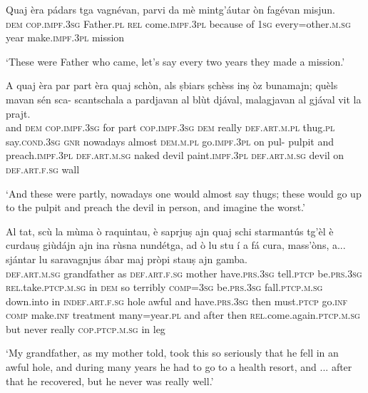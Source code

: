 \begin{linenumbers}
\gll   Quaj èra pádars tga vagnévan, parvi da mè mintg’áutar òn fagévan misjun. \\
  \textsc{dem} \textsc{cop.impf.3sg} Father.\textsc{pl} \textsc{rel} come.\textsc{impf.3pl} because of \textsc{1sg} every=other.\textsc{m.sg} year make.\textsc{impf.3pl} mission \\
\end{linenumbers}
\medskip
\glt `These were Father who came, let’s say every two years they made a mission.'
\medskip

 \begin{linenumbers}
\gll  A quaj èra par part èra quaj schòn, als ṣbiars ṣchèss inṣ òz bunamajn; quèls mavan sén sca- scantschala a pardjavan al blùt djával, malagjavan al gjával vit la prajt. \\
and  \textsc{dem} \textsc{cop.impf.3sg} for part \textsc{cop.impf.3sg} \textsc{dem} really \textsc{def.art.m.pl} thug.\textsc{pl} say.\textsc{cond.3sg} \textsc{gnr} nowadays almost   \textsc{dem.m.pl} go.\textsc{impf.3pl} on pul- pulpit and preach.\textsc{impf.3pl} \textsc{def.art.m.sg} naked devil paint.\textsc{impf.3pl} \textsc{def.art.m.sg} devil on \textsc{def.art.f.sg} wall\\
\end{linenumbers}
\medskip
\glt `And these were partly, nowadays one would almost say thugs; these would go up to the pulpit and preach the devil in person, and imagine the worst.'
\medskip

\begin{linenumbers}
\gll  Al tat, scù la mùma ò raquintau, è saprjuṣ ajn quaj schi starmantús tg’èl è curdauṣ giùdájn ajn ina rùsna nundétga, ad ò lu stu í a fá cura, mass’òns, a... sjántar lu saravagnjus ábar maj pròpi stauṣ ajn gamba.  \\
 \textsc{def.art.m.sg} grandfather as  \textsc{def.art.f.sg} mother have.\textsc{prs.3sg} tell.\textsc{ptcp} be.\textsc{prs.3sg} \textsc{rel.}take.\textsc{ptcp.m.sg} in \textsc{dem} so terribly \textsc{comp=3sg} be.\textsc{prs.3sg} fall.\textsc{ptcp.m.sg} down.into in \textsc{indef.art.f.sg} hole awful and have.\textsc{prs.3sg} then must.\textsc{ptcp} go.\textsc{inf} \textsc{comp} make.\textsc{inf} treatment many=year.\textsc{pl} and after then \textsc{rel}.come.again.\textsc{ptcp.m.sg} but never really \textsc{cop.ptcp.m.sg} in leg\\
\end{linenumbers}
\medskip
\glt `My grandfather, as my mother told, took this so seriously that he fell in an awful hole, and during many years he had to go to a health resort, and ... after that he recovered, but he never was really well.'
\medskip

